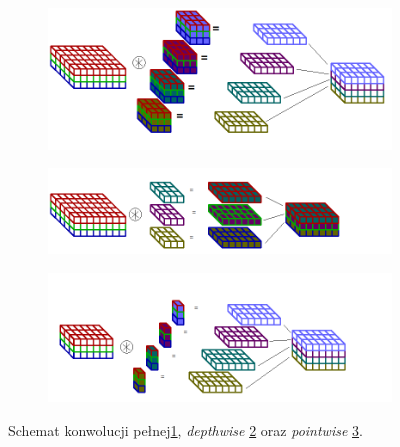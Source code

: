 \begin{figure}
    \centering
    \hfill
    \begin{subfigure}[b]{0.98\textwidth}
    \centering
    \includegraphics[width=\textwidth]{images/std_conv.png}
    \caption{}
    \label{fig:std_conv}
    \end{subfigure}
    \hfill
    \begin{subfigure}[b]{0.98\textwidth}
    \centering
    \includegraphics[width=\textwidth]{images/dw_conv.png}
    \caption{}
    \label{fig:dw}
    \end{subfigure}
    \hfill
    \begin{subfigure}[b]{0.98\textwidth}
    \centering
    \includegraphics[width=\textwidth]{images/pw_conv.png}
    \caption{}
    \label{fig:pw}
    \end{subfigure}
    
    \caption{Schemat konwolucji pełnej\ref{fig:std_conv}, \emph{depthwise} \ref{fig:dw} oraz \emph{pointwise} \ref{fig:pw}.}
    \label{fig:dw_pw_schema}
\end{figure}

